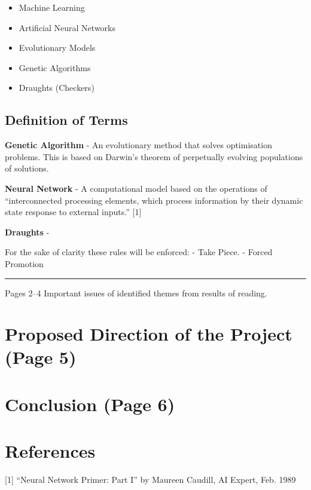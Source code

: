 \documentclass[]{article}
\providecommand{\tightlist}{%
  \setlength{\itemsep}{0pt}\setlength{\parskip}{0pt}}
\begin{document}
\begin{itemize}
\tightlist
\item
  Machine Learning
\item
  Artificial Neural Networks
\item
  Evolutionary Models
\item
  Genetic Algorithms
\item
  Draughts (Checkers)
\end{itemize}

\subsection{Definition of Terms}\label{definition-of-terms}

\textbf{Genetic Algorithm} - An evolutionary method that solves
optimisation problems. This is based on Darwin's theorem of perpetually
evolving populations of solutions.

\textbf{Neural Network} - A computational model based on the operations
of ``interconnected processing elements, which process information by
their dynamic state response to external inputs.'' {[}1{]}

\textbf{Draughts} -

For the sake of clarity these rules will be enforced: - Take Piece. -
Forced Promotion

\begin{center}\rule{0.5\linewidth}{\linethickness}\end{center}

Pages 2--4 Important issues of identified themes from results of
reading.

\section{Proposed Direction of the Project (Page
5)}\label{proposed-direction-of-the-project-page-5}

\section{Conclusion (Page 6)}\label{conclusion-page-6}

\section{References}\label{references}

{[}1{]} ``Neural Network Primer: Part I'' by Maureen Caudill, AI Expert,
Feb. 1989
\end{document}
